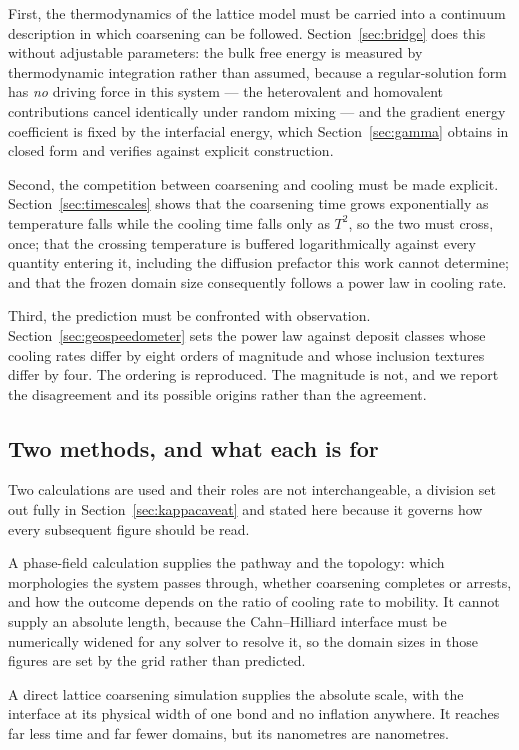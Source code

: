 \documentclass[11pt,a4paper]{article}
\begin{document}
First, the thermodynamics of the lattice model must be carried into a continuum
description in which coarsening can be followed. Section~\ref{sec:bridge} does
this without adjustable parameters: the bulk free energy is measured by
thermodynamic integration rather than assumed, because a regular-solution form
has \emph{no} driving force in this system --- the heterovalent and homovalent
contributions cancel identically under random mixing --- and the gradient energy
coefficient is fixed by the interfacial energy, which Section~\ref{sec:gamma}
obtains in closed form and verifies against explicit construction.

Second, the competition between coarsening and cooling must be made explicit.
Section~\ref{sec:timescales} shows that the coarsening time grows exponentially
as temperature falls while the cooling time falls only as $T^2$, so the two must
cross, once; that the crossing temperature is buffered logarithmically against
every quantity entering it, including the diffusion prefactor this work cannot
determine; and that the frozen domain size consequently follows a power law in
cooling rate.

Third, the prediction must be confronted with observation.
Section~\ref{sec:geospeedometer} sets the power law against deposit classes
whose cooling rates differ by eight orders of magnitude and whose inclusion
textures differ by four. The ordering is reproduced. The magnitude is not, and
we report the disagreement and its possible origins rather than the agreement.

\subsection{Two methods, and what each is for}

Two calculations are used and their roles are not interchangeable, a division
set out fully in Section~\ref{sec:kappacaveat} and stated here because it
governs how every subsequent figure should be read.

A phase-field calculation supplies the pathway and the topology: which
morphologies the system passes through, whether coarsening completes or
arrests, and how the outcome depends on the ratio of cooling rate to mobility.
It cannot supply an absolute length, because the Cahn--Hilliard interface must
be numerically widened for any solver to resolve it, so the domain sizes in
those figures are set by the grid rather than predicted.

A direct lattice coarsening simulation supplies the absolute scale, with the
interface at its physical width of one bond and no inflation anywhere. It
reaches far less time and far fewer domains, but its nanometres are nanometres.
\end{document}
